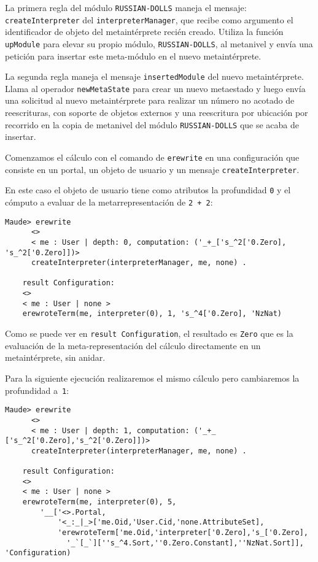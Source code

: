 La primera regla del módulo \texttt{RUSSIAN-DOLLS} maneja el mensaje: \texttt{createInterpreter} del \texttt{interpreterManager}, que recibe como argumento el identificador de objeto del metaintérprete recién creado. Utiliza la función \texttt{upModule} para elevar su propio módulo, \texttt{RUSSIAN-DOLLS}, al metanivel y envía una petición para insertar este meta-módulo en el nuevo metaintérprete.

La segunda regla maneja el mensaje \texttt{insertedModule} del nuevo metaintérprete. Llama al operador \texttt{newMetaState} para crear un nuevo metaestado y luego envía una solicitud al nuevo metaintérprete para realizar un número no acotado de reescrituras, con soporte de objetos externos y una reescritura por ubicación por recorrido en la copia de metanivel del módulo \texttt{RUSSIAN-DOLLS} que se acaba de insertar.

Comenzamos el cálculo con el comando de \texttt{erewrite} en una configuración que consiste en un portal, un objeto de usuario y un mensaje \texttt{createInterpreter}. 

En este caso el objeto de usuario tiene como atributos la profundidad \texttt{0} y el cómputo a evaluar de la metarrepresentación de \texttt{2 + 2}:

\begin{lstlisting}[language=Maude]
	Maude> erewrite
	  <>
	  < me : User | depth: 0, computation: ('_+_['s_^2['0.Zero], 's_^2['0.Zero]])>
	  createInterpreter(interpreterManager, me, none) .

	result Configuration:
	<>
	< me : User | none >
	erewroteTerm(me, interpreter(0), 1, 's_^4['0.Zero], 'NzNat)
\end{lstlisting}
\medskip

Como se puede ver en \texttt{result Configuration}, el resultado es \texttt{Zero} que es la evaluación de la meta-representación del cálculo directamente en un metaintérprete, sin anidar.
\medskip

Para la siguiente ejecución realizaremos el mismo cálculo pero cambiaremos la profundidad a~\texttt{1}:

\begin{lstlisting}[language=Maude]
	Maude> erewrite
	  <>
	  < me : User | depth: 1, computation: ('_+_ ['s_^2['0.Zero],'s_^2['0.Zero]])>
	  createInterpreter(interpreterManager, me, none) .

	result Configuration:
	<>
	< me : User | none >
	erewroteTerm(me, interpreter(0), 5,
	    '__['<>.Portal,
	        '<_:_|_>['me.Oid,'User.Cid,'none.AttributeSet],
	        'erewroteTerm['me.Oid,'interpreter['0.Zero],'s_['0.Zero],
	          '_`[_`][''s_^4.Sort,''0.Zero.Constant],''NzNat.Sort]], 'Configuration)
\end{lstlisting}
\medskip

